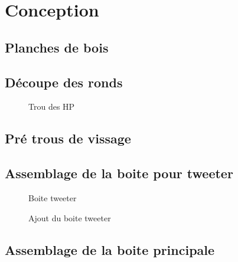 \documentclass[a4paper,english]{report}
\begin{document}
			\chapter{Conception}
					  
			 	
			
			\section{Planches de bois}

			
			\section{Découpe des ronds}

				\begin{figure}[H]
					\centering
					\label{Planche}
					\caption{Trou des HP}
				\end{figure}			
			

			
			\section{Pré trous de vissage}

			\section{Assemblage de la boite pour tweeter}

		
			    \begin{figure}[h!]
					 	
					 	\begin{minipage}[c]{.45\linewidth}
					 		\begin{center}
					 			\label{Boite tweeter}
					 			\caption{Boite tweeter}
					 		\end{center}
					 	\end{minipage}
					 	\hfill
					 	\begin{minipage}[c]{.45\linewidth}
					 		\begin{center}
					 		\label{Ajout du boite tweeter}
					 		\caption{Ajout du boite tweeter}
					 		\end{center}
					 	\end{minipage}
					 \end{figure} 	
			
			\section{Assemblage de la boite principale}
\end{document}

